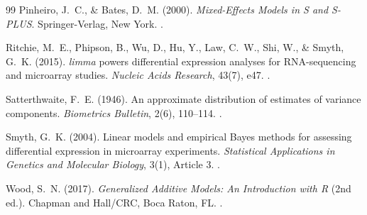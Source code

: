 \documentclass[11pt,twoside,openright]{book}
\begin{document}
\begin{thebibliography}{99}
Pinheiro, J.~C., \& Bates, D.~M. (2000). \textit{Mixed-Effects Models in S and S-PLUS}. Springer-Verlag, New York. .

Ritchie, M.~E., Phipson, B., Wu, D., Hu, Y., Law, C.~W., Shi, W., \& Smyth, G.~K. (2015). \textit{limma} powers differential expression analyses for RNA-sequencing and microarray studies. \textit{Nucleic Acids Research}, 43(7), e47. .

Satterthwaite, F.~E. (1946). An approximate distribution of estimates of variance components. \textit{Biometrics Bulletin}, 2(6), 110--114. .

Smyth, G.~K. (2004). Linear models and empirical Bayes methods for assessing differential expression in microarray experiments. \textit{Statistical Applications in Genetics and Molecular Biology}, 3(1), Article 3. .

Wood, S.~N. (2017). \textit{Generalized Additive Models: An Introduction with R} (2nd ed.). Chapman and Hall/CRC, Boca Raton, FL. .

\end{thebibliography}
\end{document}
